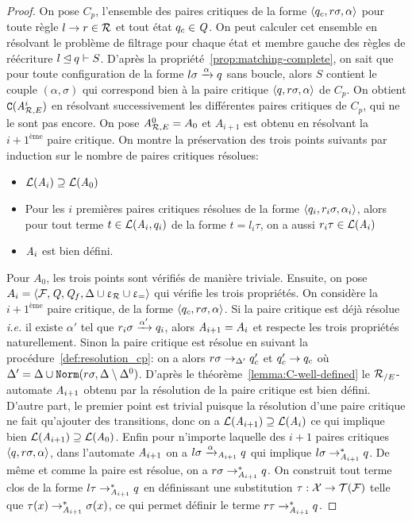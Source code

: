 \begin{proof}
  On pose $C_p$, l'ensemble des paires critiques de la forme $\langle q_c, r\sigma, \alpha\rangle$ pour toute règle $l\rightarrow r \in \mathcal R$ et tout état $q_c \in \mathit Q$.
  On peut calculer cet ensemble en résolvant le problème de filtrage pour chaque état et membre gauche des règles de réécriture $l \unlhd q \vdash S$.
  D'après la propriété~\ref{prop:matching-complete}, on sait que pour toute configuration de la forme $l\sigma \xrightarrow{\alpha} q$ sans boucle,
  alors $S$ contient le couple $(\alpha,\sigma)$ qui correspond bien à la paire critique $\langle q, r\sigma, \alpha \rangle$ de $C_p$.
  On obtient $\mathtt{C}({\mathit A}_{\mathcal R,E}^i)$ en résolvant successivement les différentes paires critiques de $C_p$, qui ne le sont pas encore.
  On pose ${\mathit A}_{\mathcal R,E}^0 = A_0$ et $A_{i+1}$ est obtenu en résolvant la $i+1^\text{ème}$ paire critique.
  On montre la préservation des trois points suivants par induction sur le nombre de paires critiques résolues:
  \begin{itemize}
  \item $\mathcal{L}(\mathit A_i) \supseteq \mathcal{L}(\mathit A_0)$
  \item Pour les $i$ premières paires critiques résolues de la forme $\langle q_i, r_i\sigma, \alpha_i\rangle$, alors
    pour tout terme $t \in \mathcal{L}(\mathit A_i, q_i)$ de la forme $t = l_i\tau$, on a aussi $r_i\tau \in \mathcal{L}(\mathit A_i)$
  \item $\mathit A_i$ est bien défini.
  \end{itemize}
  \medskip
  \noindent
  Pour $A_0$, les trois points sont vérifiés de manière triviale. Ensuite, on pose
  $A_i = \langle \mathcal{F}, \mathit Q, \mathit Q_f, \Delta\cup\upvarepsilon_{\mathcal R}\cup\upvarepsilon_{=}\rangle$ qui vérifie les trois propriétés.
  On considère la $i+1^\text{ème}$ paire critique, de la forme $\langle q_c, r\sigma, \alpha\rangle$.
  Si la paire critique est déjà résolue \textit{i.e.} il existe $\alpha'$ tel que
  $r_i\sigma \xrightarrow{\alpha'} q_i$, alors $\mathit A_{i+1} = A_i$ et respecte les trois propriétés naturellement.
  Sinon la paire critique est résolue en suivant la procédure~\ref{def:resolution_cp}: on a alors
  $r\sigma \rightarrow_{\Delta'} q_c'$ et $q_c'\rightarrow q_c$ où $\Delta' = \Delta \cup \mathtt{Norm}(r\sigma,\Delta \setminus\Delta^0)$.
  D'après le théorème~\ref{lemma:C-well-defined} le ${\mathcal R_{/E}}$-automate $\mathit A_{i+1}$ obtenu par la résolution de la paire critique
  est bien défini. D'autre part, le premier point est trivial puisque la résolution d'une paire critique ne fait qu'ajouter
  des transitions, donc on a $\mathcal{L}(\mathit A_{i+1}) \supseteq \mathcal{L}(\mathit A_i)$ ce qui implique bien $\mathcal{L}(\mathit A_{i+1}) \supseteq \mathcal{L}(\mathit A_0)$.
  Enfin pour n'importe laquelle des ${i+1}$ paires critiques $\langle q, r\sigma, \alpha\rangle$, dans l'automate $\mathit A_{i+1}$ on a
  $l\sigma \xrightarrow{\alpha}_{\mathit A_{i+1}} q$ qui implique $l\sigma \rightarrow_{\mathit A_{i+1}}^* q$. De même et comme la paire est résolue,
  on a $r\sigma \rightarrow_{\mathit A_{i+1}}^* q$. On construit tout terme clos de la forme $l\tau \rightarrow_{\mathit A_{i+1}}^* q$
  en définissant une substitution $\tau : \mathcal X \rightarrow \mathcal{T(F)}$ telle que $\tau(x) \rightarrow_{\mathit A_{i+1}}^* \sigma(x)$, ce qui permet 
  définir le terme $r\tau \rightarrow^*_{\mathit A_{i+1}} q$.


\end{proof}
